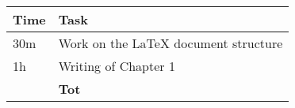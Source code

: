 \begin{center}
    {\renewcommand{\arraystretch}{2}%
    \begin{tabular}{L{2cm}L{12cm}}
        \hline
        \textbf{Time} & \textbf{Task} \\
        \hline
        30m & Work on the LaTeX document structure \\
        \hline
        1h & Writing of Chapter 1 \\
        \hline
        \textbf{} & \textbf{Tot} \\
    \end{tabular}}
\end{center}